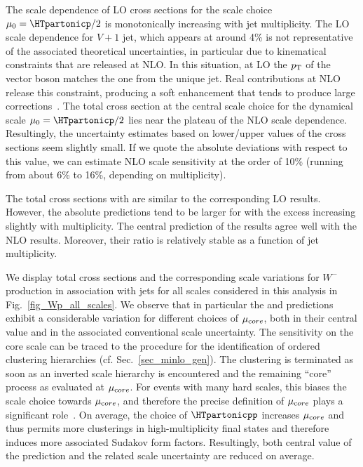 The scale dependence of LO cross sections for the scale choice
$\mu_0=\HTpartonicp/2$ is monotonically increasing with jet multiplicity. The
LO scale dependence for $V+1$ jet, which appears at around 4\% is not
representative of the associated theoretical uncertainties, in particular due to
kinematical constraints that are released at NLO. In this situation, at LO the $p_{\textrm T}$
of the vector boson matches the one from the unique jet. Real contributions at
NLO release this constraint, producing a soft enhancement that tends to produce
large corrections~\cite{Bauer:2009km,BH:W3jDistributions,Rubin:2010xp}. The total cross section at the central scale choice for the dynamical scale $\mu_0=\HTpartonicp/2$
lies near the plateau of the NLO scale dependence. Resultingly, the
uncertainty estimates based on lower/upper values of the cross sections seem slightly
small. If we quote the absolute deviations with respect to this value, we
can estimate NLO scale sensitivity at the order of 10\% (running from about 6\%
to 16\%, depending on multiplicity). 

The total cross sections with \MILOp{} are similar to the corresponding LO
results. However, the absolute predictions tend to be larger for
\MILOp{} with the excess increasing slightly with multiplicity. The
central prediction of the \MINLOp{} results agree
well with the NLO results. Moreover, their ratio is relatively stable as a function of jet multiplicity.


We display total cross sections and the corresponding scale variations for $W^-$ production in association with jets for all scales considered in this analysis in
Fig.~\ref{fig_Wp_all_scales}. We observe that in particular the \MILOp{} and \MINLOp{} predictions
exhibit a considerable variation for different choices of $\mu_{\textrm core}$, both in their central value and in
the associated conventional scale uncertainty. The sensitivity on the core scale can be traced to the procedure for the identification of ordered clustering
hierarchies (cf. Sec.~\ref{sec_minlo_gen}). The clustering is terminated as soon as an inverted scale hierarchy is encountered and the remaining ``core'' process as evaluated at $\mu_{\textrm core}$. For events with many hard scales, this biases the scale choice towards $\mu_{\textrm core}$,
and therefore the precise definition of $\mu_{\textrm core}$ plays a
significant role~\cite{CKKWincl}. On average, the choice of
$\HTpartonicpp$ increases $\mu_{\textrm core}$ and thus permits more clusterings in high-multiplicity final states and therefore induces more associated
Sudakov form factors. Resultingly, both central value of the prediction
and the related scale uncertainty are reduced on average.

